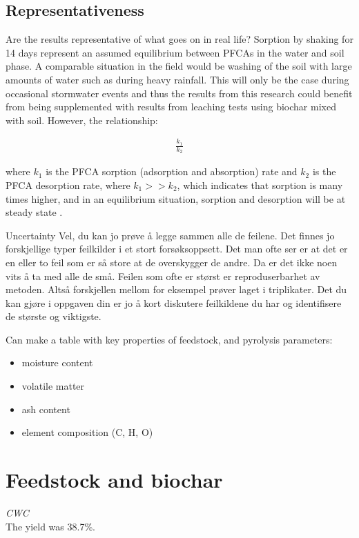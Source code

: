 \subsection{Representativeness}
Are the results representative of what goes on in real life? Sorption by shaking for 14 days represent an assumed equilibrium between PFCAs in the water and soil phase. A comparable situation in the field would be washing of the soil with large amounts of water such as during heavy rainfall. This will only be the case during occasional stormwater events and thus the results from this research could benefit from being supplemented with results from leaching tests using biochar mixed with soil. However, the relationship:

\begin{align}
    \frac{k_1}{k_2}
\end{align}

where \(k_1\) is the PFCA sorption (adsorption and absorption) rate and \(k_2\) is the PFCA desorption rate, where \(k_1>>k_2\), which indicates that sorption is many times higher, and in an equilibrium situation, sorption and desorption will be at steady state \citep{Cornelissen2005}. 

Uncertainty
Vel, du kan jo prøve å legge sammen alle de feilene. Det finnes jo forskjellige typer feilkilder i et stort forsøksoppsett. Det man ofte ser er at det er en eller to feil som er så store at de overskygger de andre. Da er det ikke noen vits å ta med alle de små. Feilen som ofte er størst er reproduserbarhet av metoden. Altså forskjellen mellom for eksempel prøver laget i triplikater. Det du kan gjøre i oppgaven din er jo å kort diskutere feilkildene du har og identifisere de største og viktigste.

Can make a table with key properties of feedstock, and pyrolysis parameters:
\begin{itemize}
\item moisture content
\item volatile matter
\item ash content
\item element composition (C, H, O)
\end{itemize}

\section{Feedstock and biochar}
\textit{CWC}\\
The yield was 38.7\%. 

